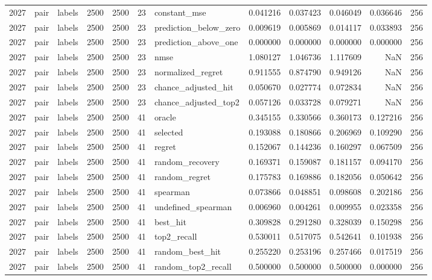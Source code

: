 \begin{tabular}{rllrrrlrrrrr}
2027 & pair & labels & 2500 & 2500 & 23 & constant_mse & 0.041216 & 0.037423 & 0.046049 & 0.036646 & 256 \\
2027 & pair & labels & 2500 & 2500 & 23 & prediction_below_zero & 0.009619 & 0.005869 & 0.014117 & 0.033893 & 256 \\
2027 & pair & labels & 2500 & 2500 & 23 & prediction_above_one & 0.000000 & 0.000000 & 0.000000 & 0.000000 & 256 \\
2027 & pair & labels & 2500 & 2500 & 23 & nmse & 1.080127 & 1.046736 & 1.117609 & NaN & 256 \\
2027 & pair & labels & 2500 & 2500 & 23 & normalized_regret & 0.911555 & 0.874790 & 0.949126 & NaN & 256 \\
2027 & pair & labels & 2500 & 2500 & 23 & chance_adjusted_hit & 0.050670 & 0.027774 & 0.072834 & NaN & 256 \\
2027 & pair & labels & 2500 & 2500 & 23 & chance_adjusted_top2 & 0.057126 & 0.033728 & 0.079271 & NaN & 256 \\
2027 & pair & labels & 2500 & 2500 & 41 & oracle & 0.345155 & 0.330566 & 0.360173 & 0.127216 & 256 \\
2027 & pair & labels & 2500 & 2500 & 41 & selected & 0.193088 & 0.180866 & 0.206969 & 0.109290 & 256 \\
2027 & pair & labels & 2500 & 2500 & 41 & regret & 0.152067 & 0.144236 & 0.160297 & 0.067509 & 256 \\
2027 & pair & labels & 2500 & 2500 & 41 & random_recovery & 0.169371 & 0.159087 & 0.181157 & 0.094170 & 256 \\
2027 & pair & labels & 2500 & 2500 & 41 & random_regret & 0.175783 & 0.169886 & 0.182056 & 0.050642 & 256 \\
2027 & pair & labels & 2500 & 2500 & 41 & spearman & 0.073866 & 0.048851 & 0.098608 & 0.202186 & 256 \\
2027 & pair & labels & 2500 & 2500 & 41 & undefined_spearman & 0.006960 & 0.004261 & 0.009955 & 0.023358 & 256 \\
2027 & pair & labels & 2500 & 2500 & 41 & best_hit & 0.309828 & 0.291280 & 0.328039 & 0.150298 & 256 \\
2027 & pair & labels & 2500 & 2500 & 41 & top2_recall & 0.530011 & 0.517075 & 0.542641 & 0.101938 & 256 \\
2027 & pair & labels & 2500 & 2500 & 41 & random_best_hit & 0.255220 & 0.253196 & 0.257466 & 0.017519 & 256 \\
2027 & pair & labels & 2500 & 2500 & 41 & random_top2_recall & 0.500000 & 0.500000 & 0.500000 & 0.000000 & 256 \\

\end{tabular}
